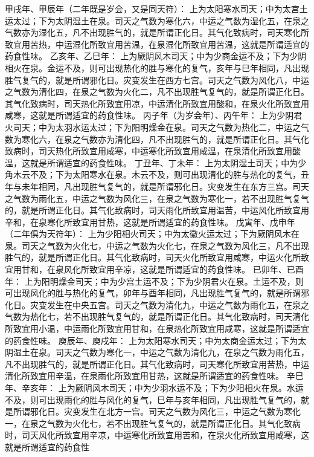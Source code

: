 \documentclass[12pt,UTF8]{ctexbook}
\begin{document}
甲戌年、甲辰年（二年既是岁会，又是同天符）：
上为太阳寒水司天；中为太宫土运太过；下为太阴湿土在泉。司天之气数为寒化六，中运之气数为湿化五，在泉之气数亦为湿化五，凡不出现胜气的，就是所谓正化日。其气化致病时，司天寒化所致宜用苦热，中运湿化所致宜用苦温，在泉湿化所致宜用苦温，这就是所谓适宜的药食性味。
乙亥年、乙巳年：
上为厥阴风木司天；中为少商金运不及；下为少阴相火在泉。金运不及，则可出现热化的胜与寒化的复气，亥年与巳年相同，凡出现胜气复气的，就是所谓邪化日。灾变发生在西方七宫。司天之气数为风化八，中运之气数为清化四，在泉之气数为火化二，凡不出现胜气复气的，就是所谓正化日。其气化致病时，司天热化所致宜用凉，中运清化所致宜用酸和，在泉火化所致宜用咸寒，这就是所谓适宜的药食性味。
丙子年（为岁会年）、丙午年：
上为少阴君火司天；中为太羽水运太过；下为阳明燥金在泉。司天之气数为热化二，中运之气数为寒化六，在泉之气数亦为清化四，凡不出现胜气的，就是所谓正化日。其气化致病时，司天热化所致宜用咸寒，中运寒化所致宜用咸温，在泉清化所致宜用酸温，这就是所谓适宜的药食性味。
丁丑年、丁未年：
上为太阴湿土司天；中为少角木云不及；下为太阳寒水在泉。木云不及，则可出现清化的胜与热化的复气，丑年与未年相同，凡出现胜气复气的，就是所谓邪化日。灾变发生在东方三宫。司天之气数为雨化五，中运之气数为风化三，在泉之气数为寒化一，若不出现胜气复气的，就是所谓正化日。其气化致病时，司天雨化所致宜用温苦，中运风化所致宜用辛和，在泉寒化所致宜用甘热，这就是所谓适宜的药食性味。
戊寅年、戊申年（二年俱为天符年）：
上为少阳相火司天；中为太徽火运太过；下为厥阴风木在泉。司天之气数为火化七，中运之气数为火化七，在泉之气数为风化三，凡不出现胜气的，就是所谓正化日。其气化致病时，司天火化所致宜用咸寒，中运火化所致宜用甘和，在泉风化所致宜用辛凉，这就是所谓适宜的药食性味。
已卯年、已酉年：
上为阳明燥金司天；中为少宫土运不及；下为少阴君火在泉。土运不及，则可出现风化的胜与热化的复气，卯年与酉年相同，凡出现胜气复气的，就是所谓邪化日。灾变发生在中央五宫。司天之气数为清化九，中运之气数为雨化五，在泉之气数为热化七，若不出现胜气复气的，就是所谓正化日。其气化致病时，司天清化所致宜用小温，中运雨化所致宜用甘和，在泉热化所致宜用咸寒，这就是所谓适宜的药食性味。
庾辰年、庾戌年：
上为太阳寒水司天；中为太商金运太过；下为太阴湿土在泉。司天之气数为寒化一，中运之气数为清化九，在泉之气数为雨化五，凡不出现胜气的，就是所谓正化日。其气化致病时，司天寒化所致宜用苦热，中运清化所致宜用辛温，在泉雨化所致宜用甘热，这就是所谓适宜的药食性味。
辛巳年、辛亥年：
上为厥阴风木司天；中为少羽水运不及；下为少阳相火在泉。水运不及，则可出现雨化的胜与风化的复气，巳年与亥年相同，凡出现胜气复气的，就是所谓邪化日。灾变发生在北方一宫。司天之气数为风化三，中运之气数为寒化一，在泉之气数为火化七，若不出现胜气复气的，就是所谓正化日。其气化致病时，司天风化所致宜用辛凉，中运寒化所致宜用苦和，在泉火化所致宜用咸寒，这就是所谓适宜的药食性
\end{document}
